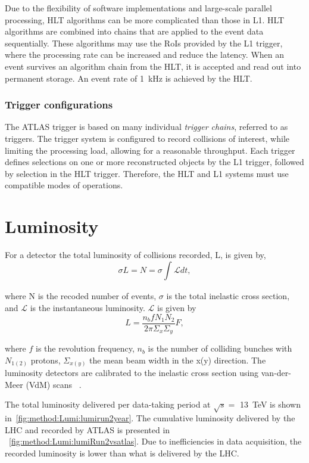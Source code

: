 Due to the flexibility of software implementations and large-scale parallel processing, HLT algorithms can be more complicated than those in L1. HLT algorithms are combined into chains that are applied to the event data sequentially. These algorithms may use the RoIs provided by the L1 trigger, where the processing rate can be increased and reduce the latency. When an event survives an algorithm chain from the HLT, it is accepted and read out into permanent storage. An event rate of \SI{1}{\kilo\hertz} is achieved by the HLT.

\subsubsection{Trigger configurations}

The ATLAS trigger is based on many individual \emph{trigger chains}, referred to as triggers. The trigger system is configured to record collisions of interest, while limiting the processing load, allowing for a reasonable throughput. Each trigger defines selections on one or more reconstructed objects by the L1 trigger, followed by selection in the HLT trigger. Therefore, the HLT and L1 systems must use compatible modes of operations.

\section{Luminosity}\label{sec:method:lumi}

For a detector the total luminosity of collisions recorded, L, is given by, 
\begin{equation}
   \sigma L = N = \sigma \int_{}^{} \mathcal{L} dt,
\end{equation}

where N is the recoded number of events, $\sigma$ is the total inelastic cross section, and $\mathcal{L}$ is the instantaneous luminosity. $\mathcal{L}$ is given by~\cite{Herr}
\begin{equation}
    L = \frac{n_b f N_1 N_2 }{2\pi \Sigma_{x} \Sigma_{y}} F,
\end{equation}

where $f$ is the revolution frequency, $n_b$ is the number of colliding bunches with $N_{1(2)}$ protons, $\Sigma_{x(y)}$ the mean beam width in the x(y) direction. The luminosity detectors are calibrated to the inelastic cross section using van-der-Meer (VdM) scans ~\cite{ATLAS:Balagura_2011,ATLAS:vanderMeer:296752}.

The total luminosity delivered per data-taking period at $\sqrt{s} = $ \SI{13}{\tera\electronvolt} is shown in~\cref{fig:method:Lumi:lumirun2year}. The cumulative luminosity delivered by the LHC and recorded by ATLAS is presented in ~\cref{fig:method:Lumi:lumiRun2vsatlas}. Due to inefficiencies in data acquisition, the recorded luminosity is lower than what is delivered by the LHC.

